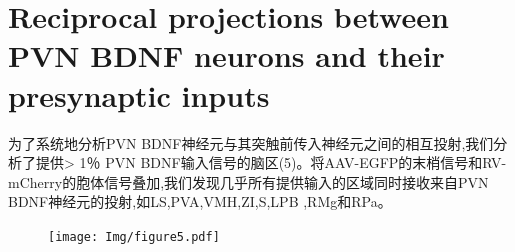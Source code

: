 \section{Reciprocal projections between PVN BDNF neurons and their presynaptic inputs}
为了系统地分析PVN BDNF神经元与其突触前传入神经元之间的相互投射,我们分析了提供> 1％ PVN BDNF输入信号的脑区(\figurename{5})。将AAV-EGFP的末梢信号和RV-mCherry的胞体信号叠加,我们发现几乎所有提供输入的区域同时接收来自PVN BDNF神经元的投射,如LS,PVA,VMH,ZI,S,LPB ,RMg和RPa。




\begin{figure}[!htbp]
    \centering
    \texttt{[image: Img/figure5.pdf]}
    \label{fig:figure5}
\end{figure}